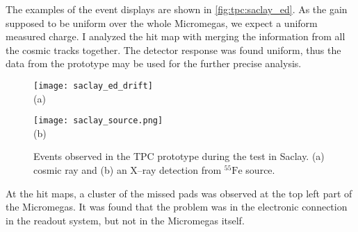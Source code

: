 \documentclass[../main.tex]{subfiles}
\begin{document}
The examples of the event displays are shown in \autoref{fig:tpc:saclay_ed}. As the gain supposed to be uniform over the whole Micromegas, we expect a uniform measured charge. I analyzed the hit map with merging the information from all the cosmic tracks together. The detector response was found uniform, thus the data from the prototype may be used for the further precise analysis.

\begin{figure}[!ht]
  \centering
  \begin{minipage}{0.49\linewidth}
  \centering
    \texttt{[image: saclay\_ed\_drift]} \\ (a)
  \end{minipage}
  \begin{minipage}{0.49\linewidth}
  \centering
    \texttt{[image: saclay\_source.png]} \\ (b)
  \end{minipage}
  \caption{Events observed in the TPC prototype during the test in Saclay. (a) cosmic ray and (b) an X--ray detection from ${}^{55}\text{Fe}$ source.}
  \label{fig:tpc:saclay_ed}
\end{figure}


At the hit maps, a cluster of the missed pads was observed at the top left part of the Micromegas. It was found that the problem was in the electronic connection in the readout system, but not in the Micromegas itself.
\end{document}
